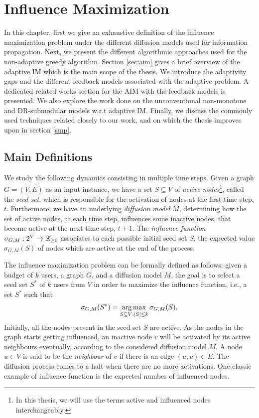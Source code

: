 



\chapter{Influence Maximization}\label{chap:lit}


In this chapter, first we give an exhaustive definition of the influence maximization problem under the different diffusion models used for information propagation. Next, we present the different algorithmic approaches used for the non-adaptive greedy algorithm. Section \ref{sec:aim} gives a brief overview of the adaptive IM which is the main scope of the thesis. We introduce the adaptivity gaps and the different feedback models associated with the adaptive problem. A dedicated related works section for the AIM with the feedback models is presented. We also explore the work done on the unconventional non-monotone and DR-submodular models w.r.t adaptive IM. Finally, we discuss the commonly used techniques related closely to our work, and on which the thesis improves upon in section \ref{smp}.




\section{Main Definitions} \label{main}
We study the following dynamics consisting in multiple time steps. Given a graph $G = (V, E)$ as an input instance, we have a set $S \subseteq V$ of \emph{active nodes}\footnote{In this thesis, we will use the terms active and influenced nodes interchangeably.}, called the \emph{seed set}, which is responsible for the activation of nodes at the first time step, $t$. Furthermore, we have an underlying \emph{diffusion model} $M$, determining how the set of {active nodes}, at each time step, influences some {inactive nodes}, that become active at the next time step, $t+1$. The {\em influence function} $\sigma_{G, M} : 2^V \rightarrow \mathbb{R}_{\geq 0}$ associates to each possible initial seed set $S$, the expected value $\sigma_{G, M}(S)$ of nodes which are active at the end of the process.

The influence maximization problem can be formally defined as follows: 
given a budget of $k$ users, a graph $G$, and a diffusion model $M$, the goal is to select a seed set $S^*$ of $k$ users from $V$ in order to maximize the influence function, i.e., a set $S^*$ such that 
\begin{equation}
\sigma_{G,M}(S^*) = \operatorname*{arg\,max}_{S\subseteq V:|S| \leq k} \sigma_{G,M}(S).
\end{equation}
Initially, all the nodes present in the seed set $S$ are active. As the nodes in the graph starts getting influenced, an inactive node $v$ will be activated by its active neighbours eventually, according to the considered diffusion model $M$. A node $u \in V$ is said to be the {\em neighbour} of $v$ if there is an edge $(u,v)\in E$. The diffusion process comes to a halt when there are no more activations. One classic example of influence function is the expected number of influenced nodes.

